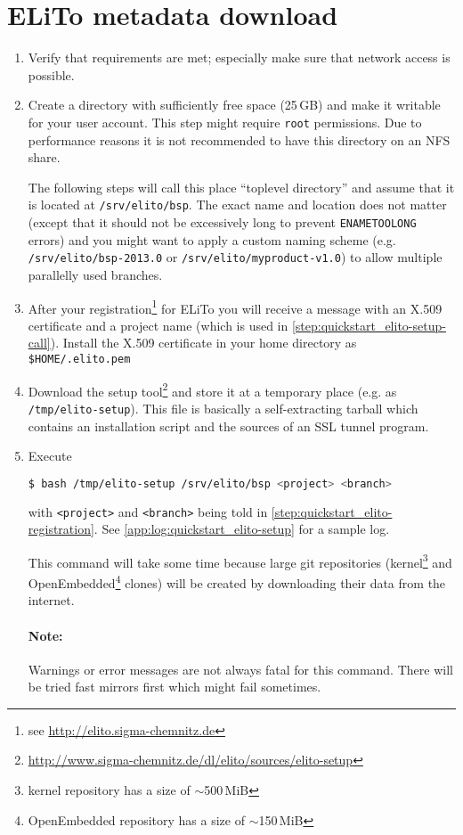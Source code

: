 \section{ELiTo metadata download}
\label{subsec:quickstart_elito-download}

\begin{enumerate}
\item Verify that requirements are met; especially make sure that
  network access is possible.
\item Create a directory with sufficiently free space (25\,GB) and make
  it writable for your user account.  This step might require
  \texttt{root} permissions.  Due to performance reasons it is not
  recommended to have this directory on an NFS share.

  The following steps will call this place ``toplevel directory'' and
  assume that it is located at \texttt{/srv/elito/bsp}.  The exact
  name and location does not matter (except that it should not be
  excessively long to prevent \texttt{ENAMETOOLONG} errors) and you
  might want to apply a custom naming scheme
  (e.g. \texttt{/srv/elito/bsp-2013.0} or
  \texttt{/srv/elito/myproduct-v1.0}) to allow multiple parallelly
  used branches.
\item\label{step:quickstart_elito-registration} After your
  registration\footnote{see \url{http://elito.sigma-chemnitz.de}} for
  ELiTo you will receive a message with an X.509 certificate and a
  project name (which is used in
  \autoref{step:quickstart_elito-setup-call}).  Install the X.509
  certificate in your home directory as \texttt{\$HOME/.elito.pem}
\item Download the setup
  tool\footnote{\url{http://www.sigma-chemnitz.de/dl/elito/sources/elito-setup}}
  and store it at a temporary place (e.g. as
  \texttt{/tmp/elito-setup}).  This file is basically a
  self-extracting tarball which contains an installation script and
  the sources of an SSL tunnel program.
\item\label{step:quickstart_elito-setup-call} Execute
\begin{lstlisting}[language=bash]
$ bash /tmp/elito-setup /srv/elito/bsp <project> <branch>
\end{lstlisting}%
  with \texttt{<project>} and \texttt{<branch>} being told in
  \autoref{step:quickstart_elito-registration}. See
  \autoref{app:log:quickstart_elito-setup} for a sample log.

  This command will take some time because large git repositories
  (kernel\footnote{kernel repository has a size of $\sim$500\,MiB} and
  OpenEmbedded\footnote{OpenEmbedded repository has a size of
    $\sim$150\,MiB} clones) will be created by downloading their data
  from the internet.

  \paragraph{Note:} Warnings or error messages are not always fatal for
  this command.  There will be tried fast mirrors first which might
  fail sometimes.
\end{enumerate}

